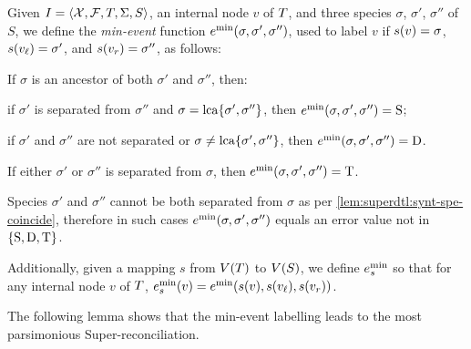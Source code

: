 \begin{definition}\label{def:superdtl:interpretation}
    Given \(I = \left\langle\mathcal{X}, \mathcal{F}, T, \Sigma, S\right\rangle\), an internal node \(v\) of \(T\), and three species \(\sigma\), \(\sigma'\), \(\sigma''\) of \(S\), we define the \emph{min-event} function \(e^{\mathrm{min}}(\sigma, \sigma', \sigma'')\), used to label \(v\) if \(s(v) = \sigma\), \(s(v_\mathit{\ell}) = \sigma'\), and \(s(v_r) = \sigma''\), as follows:
    \begin{compactitemize}
        \item If \(\sigma\) is an ancestor of both \(\sigma'\) and \(\sigma''\), then:
        \begin{compactitemize}
            \item if \(\sigma'\) is separated from \(\sigma''\) and \(\sigma = \mathrm{lca}\{\sigma', \sigma''\}\), then \(e^{\mathrm{min}}(\sigma, \sigma', \sigma'') = \mathrm{S}\);
            \item if \(\sigma'\) and \(\sigma''\) are not separated or \(\sigma \neq \mathrm{lca}\{\sigma', \sigma''\}\), then \(e^{\mathrm{min}}(\sigma, \sigma', \sigma'') = \mathrm{D}\).
        \end{compactitemize}

        \item If either \(\sigma'\) or \(\sigma''\) is separated from \(\sigma\), then \(e^{\mathrm{min}}(\sigma, \sigma', \sigma'') = \mathrm{T}\).

        \item Species \(\sigma'\) and \(\sigma''\) cannot be both separated from \(\sigma\) as per \cref{lem:superdtl:synt-spe-coincide}, therefore in such cases \(e^{\mathrm{min}}(\sigma, \sigma', \sigma'')\) equals an error value not in \(\{\mathrm{S}, \mathrm{D}, \mathrm{T}\}\).
    \end{compactitemize}
    Additionally, given a mapping \(s\) from \(V(T)\) to \(V(S)\), we define \(e^{\mathrm{min}}_s\) so that for any internal node \(v\) of \(T\), \(e^{\mathrm{min}}_s(v) = e^{\mathrm{min}}(s(v), s(v_\mathit{\ell}), s(v_r))\).
\end{definition}

The following lemma shows that the min-event labelling leads to the most parsimonious Super-reconciliation.

